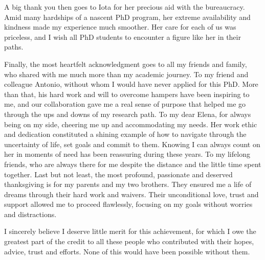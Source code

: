 \documentclass[12pt,a4paper,openright,twoside]{book}
\begin{document}
\begin{acknowledgements}
A big thank you then goes to Iota for her precious aid with the bureaucracy. Amid many hardships of a nascent PhD program, her extreme availability and kindness made my experience much smoother. Her care for each of us was priceless, and I wish all PhD students to encounter a figure like her in their paths.

Finally, the most heartfelt acknowledgment goes to all my friends and family, who shared with me much more than my academic journey. 
To my friend and colleague Antonio, without whom I would have never applied for this PhD. More than that, his hard work and will to overcome hampers have been inspiring to me, and our collaboration gave me a real sense of purpose that helped me go through the ups and downs of my research path.
To my dear Elena, for always being on my side, cheering me up and accommodating my needs. Her work ethic and dedication constituted a shining example of how to navigate through the uncertainty of life, set goals and commit to them. Knowing I can always count on her in moments of need has been reassuring during these years.
To my lifelong friends, who are always there for me despite the distance and the little time spent together.
Last but not least, the most profound, passionate and deserved thanksgiving is for my parents and my two brothers. They ensured me a life of dreams through their hard work and waivers. Their unconditional love, trust and support allowed me to proceed flawlessly, focusing on my goals without worries and distractions.

I sincerely believe I deserve little merit for this achievement, for which I owe the greatest part of the credit to all these people who contributed with their hopes, advice, trust and efforts. None of this would have been possible without them.

\end{acknowledgements}

\tableofcontents   
\listoffigures     %
\listoftables

\mainmatter





\end{document}
